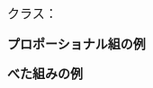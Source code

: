 \documentclass[a4paper,draft,twocolumn]{\class}
\begin{document}
クラス：\texttt{\class}

\vspace{\baselineskip}
\begingroup
\propshape
{\bfseries プロポーショナル組の例}

\test
\endgroup
\newpage
\phantom{クラス}

\vspace{\baselineskip}
{\bfseries べた組みの例}

\test
\end{document}
